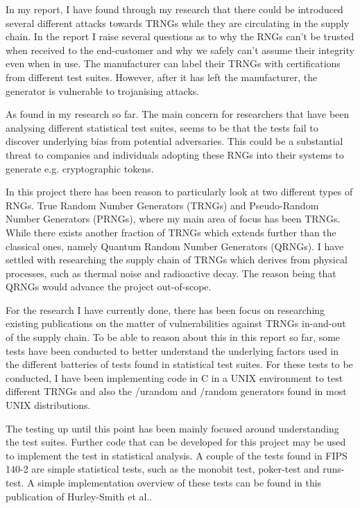 \documentclass[]{final_report}
\begin{document}
\par{In my  report, I have found through my research that there could be introduced several different attacks towards TRNGs while they are circulating in the supply chain. In the report I raise several questions as to why the RNGs can't be trusted when received to the end-customer and why we safely can't assume their integrity even when in use. The manufacturer can label their TRNGs with certifications from different test suites. However, after it has left the manufacturer, the generator is vulnerable to trojanising attacks.}

\par{As found in my research so far. The main concern for researchers that have been analysing different statistical test suites, seems to be that the tests fail to discover underlying bias from potential adversaries. This could be a substantial threat to companies and individuals adopting these RNGs into their systems to generate e.g. cryptographic tokens.}

\par{In this project there has been reason to particularly look at two different types of RNGs. True Random Number Generators (TRNGs) and Pseudo-Random Number Generators (PRNGs), where my main area of focus has been TRNGs. While there exists another fraction of TRNGs which extends further than the classical ones, namely Quantum Random Number Generators (QRNGs). I have settled with researching the supply chain of TRNGs which derives from physical processes, such as thermal noise and radioactive decay. The reason being that QRNGs would advance the project out-of-scope.}

\par{For the research I have currently done, there has been focus on researching existing publications on the matter of vulnerabilities against TRNGs in-and-out of the supply chain. To be able to reason about this in this report so far, some tests have been conducted to better understand the underlying factors used in the different batteries of tests found in statistical test suites. For these tests to be conducted, I have been implementing code in C in a UNIX environment to test different TRNGs and also the /urandom and /random generators found in most UNIX distributions.}

\par{The testing up until this point has been mainly focused around understanding the test suites. Further code that can be developed for this project may be used to implement the test in statistical analysis. A couple of the tests found in FIPS 140-2 are simple statistical tests, such as the monobit test, poker-test and runs-test. A simple implementation overview of these tests can be found in this publication of Hurley-Smith et al.\cite{Smith:2020}.}
\end{document}
